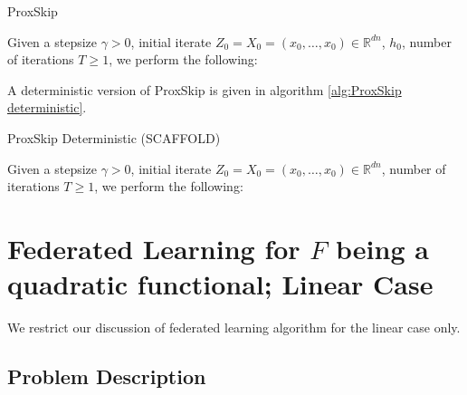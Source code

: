 \begin{itemize}
\begin{algorithm}[H]
\caption{ProxSkip}\label{alg:ProxSkip}
Given a stepsize $\gamma > 0$, initial iterate $Z_0 = X_0 = (x_0, \dots, x_0) \in \mathbb{R}^{dn}$, $h_0$, number of iterations $T \geq 1$, we perform the following:  
\begin{algorithmic}
    \Else
    \EndIf 
\EndFor
\end{algorithmic}
\end{algorithm}

A deterministic version of ProxSkip is given in algorithm \ref{alg:ProxSkip deterministic}. 

\begin{algorithm}[H]
\caption{ProxSkip Deterministic (SCAFFOLD)}\label{alg:ProxSkip deterministic}
Given a stepsize $\gamma > 0$, initial iterate $Z_0 = X_0 = (x_0, \dots, x_0) \in \mathbb{R}^{dn}$, number of iterations $T \geq 1$, we perform the following:  
\begin{algorithmic}
    \EndFor    
\EndFor
\end{algorithmic}
\end{algorithm}


\section{Federated Learning for $F$ being a quadratic functional; Linear Case} 

We restrict our discussion of federated learning algorithm for the linear case only. 

\subsection{Problem Description} 


\end{itemize}
